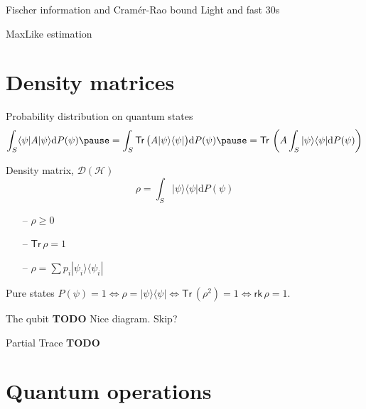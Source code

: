 \documentclass{beamer}
\newcommand{\TODO}{\textbf{TODO}}
\newcommand{\ket}[1]{|#1\rangle}
\newcommand{\bra}[1]{\langle#1|}
\newcommand{\dd}{\mathrm{d}}
\newcommand{\Tr}{\mathsf{Tr}\,}
\newcommand{\rk}{\mathsf{rk}\,}
\begin{document}
\begin{frame}{Fischer information and Cramér-Rao bound}
  Light and fast 30s
\end{frame}

\begin{frame}{MaxLike estimation}
\end{frame}



\section{Density matrices}

\begin{frame}{Probability distribution on quantum states}
  \[\int_S \bra \psi A\ket \psi \dd P(\psi)\pause = \int_S \Tr\big(A\ket \psi \bra \psi\big) \dd
    P(\psi) \pause = \Tr\left(A \int_S\ket \psi \bra \psi \dd P(\psi) \right)\]
  \pause{}
  \begin{block}{Density matrix, $\mathcal{D}(\mathcal{H})$}
    \[\rho = \int_S\ket \psi \bra \psi \dd P(\psi)\]
  \end{block}

  \pause{}

\begin{itemize}
  \item[--] $\rho \geqslant 0$
    \pause{}
  \item[--] $\Tr \rho = 1$
    \pause{}
  \item[--] $\rho = \sum p_i \ket {\psi_i} \bra{\psi_i}$
\end{itemize}

  \pause{} \vspace{3mm}

\begin{block}{Pure states}
  $P(\psi) = 1 \iff \rho = \ket \psi \bra \psi \iff \Tr(\rho^2) = 1 \iff \rk
  \rho = 1$.
\end{block}
\end{frame}

\begin{frame}{The qubit}
  \TODO{} Nice diagram. Skip?
\end{frame}

\begin{frame}{Partial Trace}
  \TODO{}
\end{frame}



\section{Quantum operations}
\end{document}
